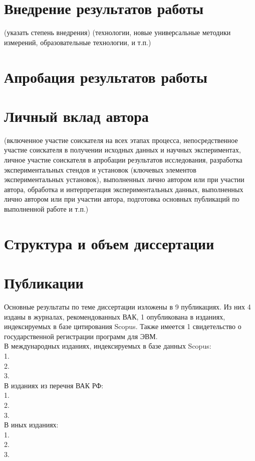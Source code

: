 \section*{Внедрение результатов работы}
(указать степень внедрения) (технологии, новые универсальные методики измерений, образовательные технологии, и т.п.)

\section*{Апробация результатов работы}
\section*{Личный вклад автора}
(включенное участие соискателя на всех этапах процесса, непосредственное участие соискателя в получении исходных данных и научных экспериментах, личное участие соискателя в апробации результатов исследования, разработка экспериментальных стендов и установок (ключевых элементов экспериментальных установок), выполненных лично автором или при участии автора, обработка и интерпретация экспериментальных данных, выполненных лично автором или при участии автора, подготовка основных публикаций по выполненной работе и т.п.)

\section*{Структура и объем диссертации}
\section*{Публикации}
Основные результаты по теме диссертации изложены в 9 публикациях. Из них 4 изданы в журналах, рекомендованных ВАК, 1 опубликована в изданиях, индексируемых в базе цитирования Scopus. Также имеется 1 свидетельство о государственной регистрации программ для ЭВМ.\\

В международных изданиях, индексируемых в базе данных Scopus:\\
1.\\
2.\\
3.\\

В изданиях из перечня ВАК РФ:\\
1.\\
2.\\
3.\\

В иных изданиях:\\
1.\\
2.\\
3. 

